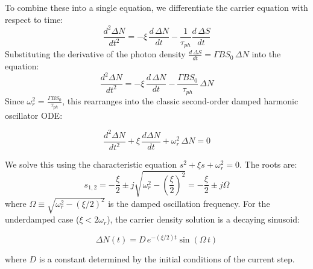 To combine these into a single equation, we differentiate the carrier equation with respect to time:
\begin{equation*}
    \frac{d^2\Delta N}{dt^2} = -\xi\,\frac{d\,\Delta N}{dt} - \frac{1}{\tau_{ph}}\frac{d\,\Delta S}{dt}
\end{equation*}
Substituting the derivative of the photon density $\frac{d\,\Delta S}{dt} = \Gamma B S_0\,\Delta N$ into the equation:
\begin{equation*}
    \frac{d^2\Delta N}{dt^2} = -\xi\,\frac{d\,\Delta N}{dt} - \frac{\Gamma B S_0}{\tau_{ph}}\,\Delta N
\end{equation*}
Since $\omega_r^2 = \frac{\Gamma B S_0}{\tau_{ph}}$, this rearranges into the classic second-order damped harmonic oscillator ODE:
\begin{keyresult}
    \begin{equation}
        \frac{d^2\Delta N}{dt^2} + \xi\,\frac{d\Delta N}{dt} + \omega_r^2\,\Delta N = 0
    \end{equation}
\end{keyresult}

We solve this using the characteristic equation $s^2 + \xi s + \omega_r^2 = 0$. The roots are:
\begin{equation*}
    s_{1,2} = -\frac{\xi}{2} \pm j\sqrt{\omega_r^2 - \left(\frac{\xi}{2}\right)^2} = -\frac{\xi}{2} \pm j\Omega
\end{equation*}
where $\Omega \equiv \sqrt{\omega_r^2 - (\xi/2)^2}$ is the damped oscillation frequency. For the underdamped case ($\xi < 2\omega_r$), the carrier density solution is a decaying sinusoid:
\begin{keyresult}
    \begin{equation}
        \Delta N(t) = D\,e^{-(\xi/2) t}\sin(\Omega\,t)
    \end{equation}
\end{keyresult}
where $D$ is a constant determined by the initial conditions of the current step. 

